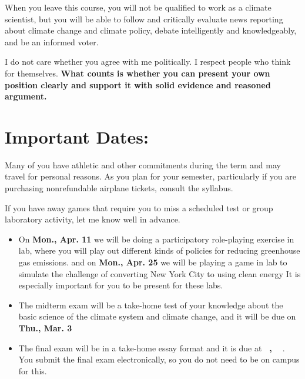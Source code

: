 \documentclass[11pt,twoside]{jgsyllabus}\usepackage[]{graphicx}\usepackage[]{color}
\begin{document}
When you leave this course, you will not be qualified to work as a climate
scientist, but you will be able to follow and critically evaluate news
reporting about climate change and climate policy, debate intelligently and
knowledgeably, and be an informed voter.

I do not care whether you agree with me politically.
I respect people who think for themselves.
\textbf{What counts is whether you can present your own position clearly
and support it with solid evidence and reasoned argument.}
%
%
%
\iftrue
\section{Important Dates:}
Many of you have athletic and other commitments during the term and may travel
for personal reasons. As you plan for your semester, particularly if you are
purchasing nonrefundable airplane tickets, consult the syllabus.

If you have away games that require you to miss a scheduled test or group
laboratory activity, let me know well in advance.
\begin{itemize}
  \iffalse
    \item The mid-term test is on
      \textbf{Thursday, March~3}.
  \fi
  \item On
    \textbf{Mon., Apr. 11}
    we will be doing a participatory role-playing
    exercise in lab, where you will play out different kinds of policies
    for reducing greenhouse gas emissions.
    and on
    \textbf{Mon., Apr. 25}
    we will be playing a game in lab to simulate the challenge of converting
    New York City to using clean energy
    It is especially important for you to  be present for these labs.
\item The midterm exam will be a take-home test of your knowledge about the
    basic science of the climate system and climate change, and it will be
    due on
    \textbf{Thu., Mar. 3}
\item The final exam will be in a take-home essay format and it is due at
  \textbf{\TakeHomeExamEndTime~\TakeHomeExamDay,
    \TakeHomeExamMonth~\TakeHomeExamDate}%
  . You submit the final exam electronically, so you do not need to be on campus
  for this.
\end{itemize}
\fi
%
%
%
%
%
\clearpage
\end{document}
